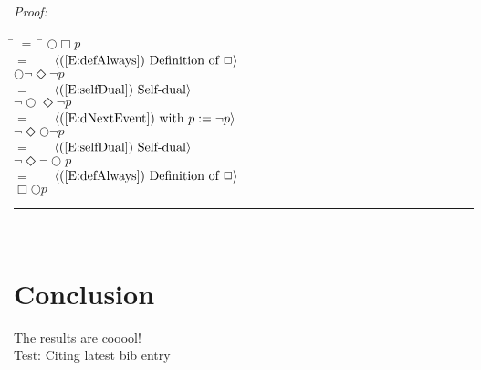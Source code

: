 \documentclass[fleqn, leqno]{article}
\newcommand{\lgap}{2pt}                             %
\newcommand{\mymathindent}{24pt}                      %
\newcommand{\myqed}{\hfill\rule[-.23ex]{1.2ex}{2.0ex}}
\newcommand{\Gll} {\langle}                         %
\newcommand{\Ggg} {\rangle}                         %
\newcommand{\Hint}[1]     {\ \ \ $\Gll              \mbox{#1} \Ggg$ }   %
\begin{document}
\emph{Proof:}
\begin{tabbing}
\hspace{\mymathindent} \= $= \;$ \= \kill
  \> \>   $\bigcirc\Box p$\\[\lgap]
  \> $=$  \>  \Hint{(\ref{E:defAlways}) Definition of $\Box$}\\[\lgap]
  \> \>   $\bigcirc\lnot\Diamond\lnot p$\\[\lgap]
  \> $=$  \>  \Hint{(\ref{E:selfDual}) Self-dual}\\[\lgap]
  \> \>   $\lnot\bigcirc\Diamond\lnot p$\\[\lgap]
  \> $=$  \>  \Hint{(\ref{E:dNextEvent}) with $p := \lnot p$}\\[\lgap]
  \> \>   $\lnot\Diamond\bigcirc\lnot p$\\[\lgap]
  \> $=$  \>  \Hint{(\ref{E:selfDual}) Self-dual}\\[\lgap]
  \> \>   $\lnot\Diamond\lnot\bigcirc p$\\[\lgap]
  \> $=$  \>  \Hint{(\ref{E:defAlways}) Definition of $\Box$}\\[\lgap]
  \> \>   $\Box\bigcirc p$\\[\lgap]
\end{tabbing}
\myqed\\[\lgap]





\section*{Conclusion}

The results are cooool!\\

Test: Citing latest bib entry\cite{GandS}\\



\end{document}
